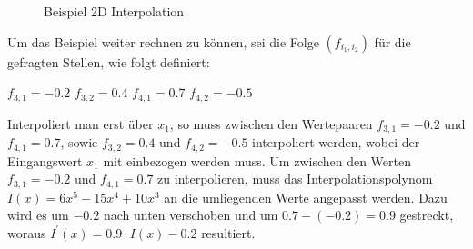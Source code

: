 \documentclass[11pt,a4paper]{article}
\begin{document}
\begin{center}
\begin{figure}[h!]
\centering
{}
\caption[Beispiel 2D Interpolation]{Beispiel 2D Interpolation}
\end{figure}
\end{center}
\noindent
Um das Beispiel weiter rechnen zu können, sei die Folge $(f_{i_1, i_2})$ für die gefragten Stellen, wie folgt definiert:
\begin{center}
$f_{3, 1} = -0.2$ \hspace{10pt} $f_{3, 2} = 0.4$ \hspace{10pt} $f_{4, 1} = 0.7$ \hspace{10pt} $f_{4, 2} = -0.5$\\
\end{center}
\noindent
Interpoliert man erst über $x_1$, so muss zwischen den Wertepaaren $f_{3, 1} = -0.2$ und $f_{4, 1} = 0.7$, sowie $f_{3, 2} = 0.4$ und $f_{4, 2} = -0.5$ interpoliert werden, wobei der Eingangswert $x_1$ mit einbezogen werden muss. Um zwischen den Werten $f_{3, 1} = -0.2$ und $f_{4, 1} = 0.7$ zu interpolieren, muss das Interpolationspolynom $I(x) = 6x^5-15x^4+10x^3$ an die umliegenden Werte angepasst werden. Dazu wird es um $-0.2$ nach unten verschoben und um $0.7 - (-0.2) = 0.9$ gestreckt, woraus $I^\prime(x) = 0.9 \cdot I(x) - 0.2$ resultiert.
\end{document}
